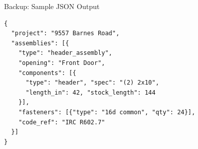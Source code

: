 \documentclass[11pt,aspectratio=169]{beamer}
\begin{document}
\begin{frame}[fragile]{Backup: Sample JSON Output}
\tiny
\begin{verbatim}
{
  "project": "9557 Barnes Road",
  "assemblies": [{
    "type": "header_assembly",
    "opening": "Front Door",
    "components": [{
      "type": "header", "spec": "(2) 2x10",
      "length_in": 42, "stock_length": 144
    }],
    "fasteners": [{"type": "16d common", "qty": 24}],
    "code_ref": "IRC R602.7"
  }]
}
\end{verbatim}
\end{frame}
\end{document}
